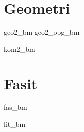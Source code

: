\chapter{Geometri \label{Geometri2}}
\newpage
{geo2_bm}
{geo2_opg_bm}

\newpage
{kom2_bm}

\newpage

\chapter*{Fasit}
{}
{fas_bm}

{lit_bm}
{	
\printindex
}

\newpage
\phantom{}
\newpage
\phantom{}







